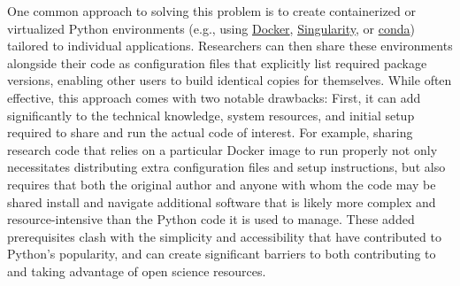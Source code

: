 \documentclass[preprint,12pt, a4paper]{elsarticle}
\begin{document}
One common approach to solving this problem is to create containerized or virtualized Python environments (e.g., using \href{https://www.docker.com/}{Docker}, \href{https://sylabs.io/singularity/}{Singularity}, or \href{https://docs.conda.io/en/latest/}{conda}) tailored to individual applications. 
Researchers can then share these environments alongside their code as configuration files that explicitly list required package versions, enabling other users to build identical copies for themselves. 
While often effective, this approach comes with two notable drawbacks: 
First, it can add significantly to the technical knowledge, system resources, and initial setup required to share and run the actual code of interest. 
For example, sharing research code that relies on a particular Docker image to run properly not only necessitates distributing extra configuration files and setup instructions, but also requires that both the original author and anyone with whom the code may be shared install and navigate additional software that is likely more complex and resource-intensive than the Python code it is used to manage. 
These added prerequisites clash with the simplicity and accessibility that have contributed to Python's popularity, and can create significant barriers to both contributing to and taking advantage of open science resources.

\end{document}
